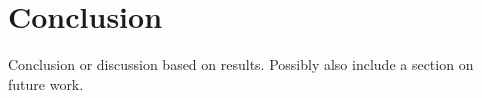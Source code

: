 
\chapter{Conclusion}

Conclusion or discussion based on results.
Possibly also include a section on future work.

\cleardoublepage